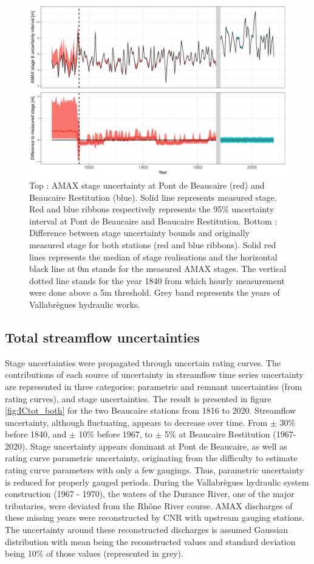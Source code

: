 \documentclass[11pt]{article}
\begin{document}
    \begin{figure}[h!]
        \centering
        \includegraphics[width=0.8\linewidth]{Figs/8-StageErrorAMAX_BOTH.pdf}\hfill
        \caption{Top : AMAX stage uncertainty at Pont de Beaucaire (red) and Beaucaire Restitution (blue). Solid line represents measured stage. Red and blue ribbons respectively represents the 95\% uncertainty interval at Pont de Beaucaire and Beaucaire Restitution.
        Bottom : Difference between stage uncertainty bounds and originally measured stage for both stations (red and blue ribbons). Solid red lines represents the median of stage realisations and the horizontal black line at 0m stands for the measured AMAX stages. The vertical dotted line stands for the year 1840 from which hourly measurement were done above a 5m threshold. Grey band represents the years of Vallabrègues hydraulic works.}
        \label{fig:StageErrAMAX}
    \end{figure}
  

    \subsection{Total streamflow uncertainties}
    
    Stage uncertainties were propagated through uncertain rating curves. The contributions of each source of uncertainty in streamflow time series uncertainty are represented in three categories: parametric and remnant uncertainties (from rating curves), and stage uncertainties. The result is presented in figure \ref{fig:ICtot_both} for the two Beaucaire stations from 1816 to 2020. Streamflow uncertainty, although fluctuating, appears to decrease over time. From $\pm$ 30\% before 1840, and $\pm$ 10\% before 1967, to $\pm$ 5\% at Beaucaire Restitution (1967-2020). Stage uncertainty appears dominant at Pont de Beaucaire, as well as rating curve parametric uncertainty, originating from the difficulty to estimate rating curve parameters with only a few gaugings. Thus, parametric uncertainty is reduced for properly gauged periods. During the Vallabrègues hydraulic system construction (1967 - 1970), the waters of the Durance River, one of the major tributaries, were deviated from the Rhône River course. AMAX discharges of these missing years were reconstructed by CNR with upstream gauging stations. The uncertainty around these reconstructed discharges is assumed Gaussian distribution with mean being the reconstructed values and standard deviation being 10\% of those values (represented in grey).
    
\end{document}
